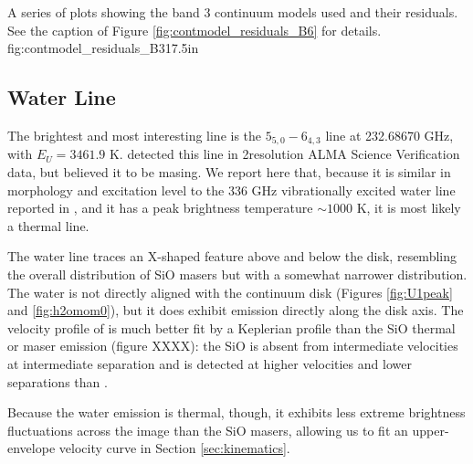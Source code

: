 \documentclass[twocolumn]{aastex61}
\begin{document}
{A series of plots showing the band 3 continuum models used and their residuals.
See the caption of Figure \ref{fig:contmodel_residuals_B6} for details.
}
{fig:contmodel_residuals_B3}{1}{7.5in}




\subsection{Water Line}
The brightest and most interesting line is the \water $5_{5,0}-6_{4,3}$ line at
232.68670 GHz, with $E_U=3461.9$ K.  \citet{Hirota2012a} detected this line
in 2\arcsec resolution ALMA Science Verification data, but believed it to be
masing.  We report here that, because it is similar in morphology and
excitation level to the 336 GHz vibrationally excited water line reported in
\citet{Hirota2014a}, and it has a peak brightness temperature $\sim1000$ K, it
is most likely a thermal line.

The water line traces an X-shaped feature above and below the disk, resembling
the overall distribution of SiO masers but with a somewhat narrower
distribution.  The water is not directly aligned with the continuum disk
(Figures \ref{fig:U1peak} and \ref{fig:h2omom0}), but it does exhibit
emission directly along the disk axis.  The velocity profile of \water
is much better fit by a Keplerian profile than the SiO thermal or maser
emission (figure XXXX): the SiO is absent from intermediate velocities
at intermediate separation and is detected at higher velocities and lower
separations than \water.

Because the water emission is thermal, though, it exhibits less extreme
brightness fluctuations across the image than the SiO masers, allowing us to
fit an upper-envelope velocity curve in Section \ref{sec:kinematics}.

\end{document}
